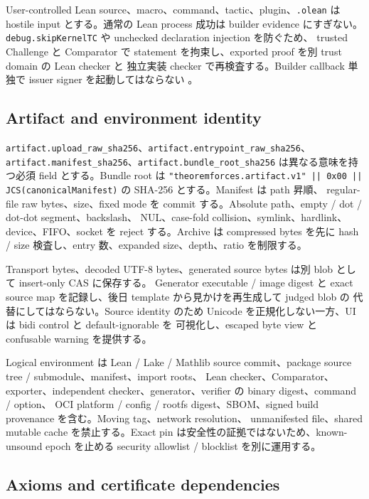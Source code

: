 \documentclass[a4paper,11pt]{ltjsarticle}
\newcommand{\code}[1]{\texttt{#1}}
\begin{document}
User-controlled Lean source、macro、command、tactic、plugin、\code{.olean} は hostile input とする。通常の Lean process
成功は builder evidence にすぎない。\code{debug.skipKernelTC} や unchecked declaration injection を防ぐため、
trusted Challenge と Comparator で statement を拘束し、exported proof を別 trust domain の Lean checker と
独立実装 checker で再検査する。Builder callback 単独で issuer signer を起動してはならない
\cite{leanvalidate,leancomparator}。

\subsection{Artifact and environment identity}

\code{artifact.upload\_raw\_sha256}、\code{artifact.entrypoint\_raw\_sha256}、\\
\code{artifact.manifest\_sha256}、\code{artifact.bundle\_root\_sha256} は異なる意味を持つ必須 field とする。Bundle root は
\code{"theoremforces.artifact.v1" || 0x00 || JCS(canonicalManifest)} の SHA-256 とする。Manifest は path 昇順、
regular-file raw bytes、size、fixed mode を commit する。Absolute path、empty / dot / dot-dot segment、backslash、
NUL、case-fold collision、symlink、hardlink、device、FIFO、socket を reject する。Archive は compressed bytes を先に
hash / size 検査し、entry 数、expanded size、depth、ratio を制限する。

Transport bytes、decoded UTF-8 bytes、generated source bytes は別 blob として insert-only CAS に保存する。
Generator executable / image digest と exact source map を記録し、後日 template から見かけを再生成して judged blob の
代替にしてはならない。Source identity のため Unicode を正規化しない一方、UI は bidi control と default-ignorable を
可視化し、escaped byte view と confusable warning を提供する。

Logical environment は Lean / Lake / Mathlib source commit、package source tree / submodule、manifest、import roots、
Lean checker、Comparator、exporter、independent checker、generator、verifier の binary digest、command / option、
OCI platform / config / rootfs digest、SBOM、signed build provenance を含む。Moving tag、network resolution、
unmanifested file、shared mutable cache を禁止する。Exact pin は安全性の証拠ではないため、known-unsound epoch を止める
security allowlist / blocklist を別に運用する。

\subsection{Axioms and certificate dependencies}
\end{document}

